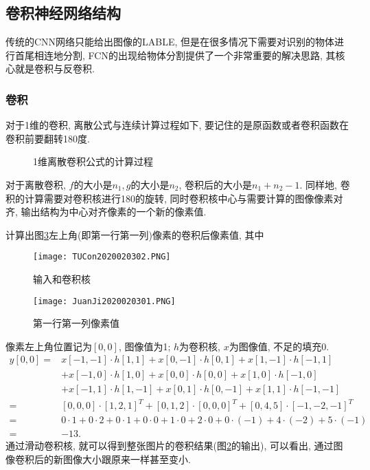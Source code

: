 \subsection{卷积神经网络结构}
传统的CNN网络只能给出图像的LABLE, 但是在很多情况下需要对识别的物体进行首尾相连地分割, FCN的出现给物体分割提供了一个非常重要的解决思路, 其核心就是卷积与反卷积.
\subsubsection{卷积}
对于1维的卷积, 离散公式与连续计算过程如下, 要记住的是原函数或者卷积函数在卷积前要翻转180度.
\begin{figure}[H]
\centering
{}
\caption{1维离散卷积公式的计算过程}
\label{ConvolutionOP0203}
\end{figure}

对于离散卷积, $f$的大小是$n_1, g$的大小是$n_2$, 卷积后的大小是$n_1+n_2-1$.
同样地, 卷积的计算需要对卷积核进行180的旋转, 同时卷积核中心与需要计算的图像像素对齐, 输出结构为中心对齐像素的一个新的像素值.
\begin{example}
计算出图\ref{JuanJi2020020301}左上角(即第一行第一列)像素的卷积后像素值, 其中
\begin{figure}[H]
\centering
\texttt{[image: TUCon2020020302.PNG]}
\caption{输入和卷积核}
\label{TUCon2020020302}
\end{figure}
\begin{figure}[H]
\centering
\texttt{[image: JuanJi2020020301.PNG]}
\caption{第一行第一列像素值}
\label{JuanJi2020020301}
\end{figure}
像素左上角位置记为$[0,0]$, 图像值为1; $h$为卷积核, $x$为图像值, 不足的填充0.
$$
\begin{aligned}
y[0,0]=& x[-1,-1] \cdot h[1,1]+x[0,-1] \cdot h[0,1]+x[1,-1] \cdot h[-1,1] \\
       &+x[-1,0] \cdot h[1,0]+x[0,0] \cdot h[0,0]+x[1,0] \cdot h[-1,0] \\
       &+x[-1,1] \cdot h[1,-1]+x[0,1] \cdot h[0,-1]+x[1,1] \cdot h[-1,-1] \\
      =&[0,0,0]\cdot [1,2,1]^T+[0,1,2]\cdot [0,0,0]^T+[0,4,5]\cdot [-1,-2,-1]^T\\
      =& 0\cdot 1+0 \cdot 2+0 \cdot 1+0 \cdot 0+1 \cdot 0+2 \cdot 0+0 \cdot(-1)+4 \cdot(-2)+5 \cdot(-1)\\
      =&-13.
\end{aligned}$$
通过滑动卷积核, 就可以得到整张图片的卷积结果(图\ref{TUCon2020020302}的输出), 可以看出, 通过图像卷积后的新图像大小跟原来一样甚至变小.
\vspace{-0.4cm}
\end{example}


